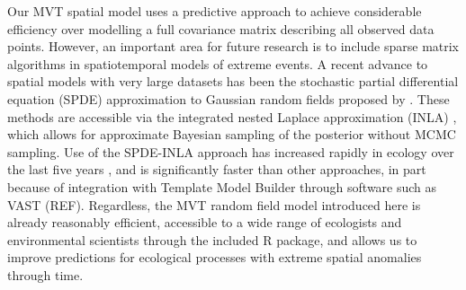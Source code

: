 \documentclass[12pt,english]{article}
\begin{document}
\begin{spacing}{1.9}
Our MVT spatial model uses a predictive approach to achieve considerable
efficiency over modelling a full covariance matrix describing all
observed data points. However, an important area for future research is to
include sparse matrix algorithms in spatiotemporal models of extreme events. A
recent advance to spatial models with very large datasets has been the
stochastic partial differential equation (SPDE) approximation to Gaussian random
fields proposed by \citet{lindgren2011}. These methods are accessible via the
integrated nested Laplace approximation (INLA) \citep{rue2009}, which allows for
approximate Bayesian sampling of the posterior without MCMC sampling. Use of the
SPDE-INLA approach has increased rapidly in ecology over the last five years
\citep[e.g.][]{illian2013, ono2016}, and is significantly faster than other
approaches, in part because of integration with Template Model Builder through
software such as VAST (REF). Regardless, the MVT random field model introduced
here is already reasonably efficient, accessible to a wide range of ecologists
and environmental scientists through the included R package, and allows us to
improve predictions for ecological processes with extreme spatial anomalies
through time.


%
%


\end{spacing}
\end{document}
